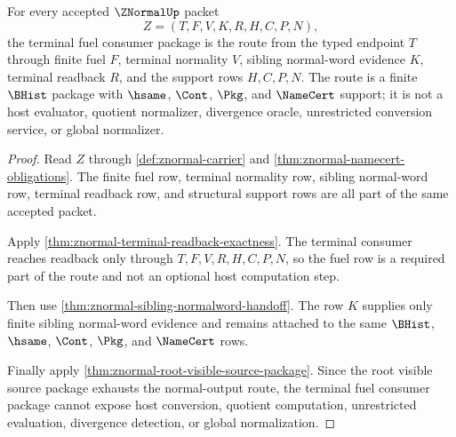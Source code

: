 \begin{theorem}
\label{thm:znormal-terminal-fuel-consumer-package}
For every accepted $\ZNormalUp$ packet
$$
Z=(T,F,V,K,R,H,C,P,N),
$$
the terminal fuel consumer package is the route from the typed endpoint $T$
through finite fuel $F$, terminal normality $V$, sibling normal-word evidence
$K$, terminal readback $R$, and the support rows $H,C,P,N$. The route is a
finite $\BHist$ package with $\hsame$, $\Cont$, $\Pkg$, and $\NameCert$ support;
it is not a host evaluator, quotient normalizer, divergence oracle,
unrestricted conversion service, or global normalizer.
\end{theorem}
\begin{proof}
Read $Z$ through \autoref{def:znormal-carrier} and
\autoref{thm:znormal-namecert-obligations}. The finite fuel row, terminal
normality row, sibling normal-word row, terminal readback row, and structural
support rows are all part of the same accepted packet.

Apply \autoref{thm:znormal-terminal-readback-exactness}. The terminal
consumer reaches readback only through $T,F,V,R,H,C,P,N$, so the fuel row is a
required part of the route and not an optional host computation step.

Then use \autoref{thm:znormal-sibling-normalword-handoff}. The row $K$
supplies only finite sibling normal-word evidence and remains attached to the
same $\BHist$, $\hsame$, $\Cont$, $\Pkg$, and $\NameCert$ rows.

Finally apply \autoref{thm:znormal-root-visible-source-package}. Since the
root visible source package exhausts the normal-output route, the terminal fuel
consumer package cannot expose host conversion, quotient computation,
unrestricted evaluation, divergence detection, or global normalization.
\end{proof}
